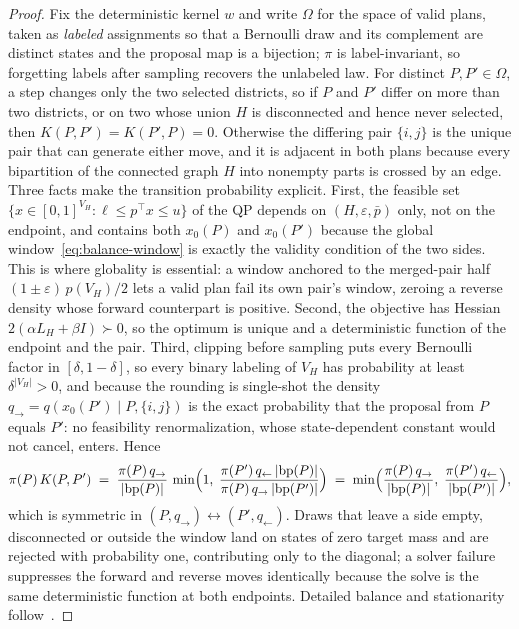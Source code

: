 \documentclass[11pt]{article}
\begin{document}
\begin{proof}
Fix the deterministic kernel $w$ and write $\Omega$ for the space of
valid plans, taken as \emph{labeled} assignments so that a Bernoulli
draw and its complement are distinct states and the proposal map is a
bijection; $\pi$ is label-invariant, so forgetting labels after
sampling recovers the unlabeled law. For distinct $P, P' \in \Omega$,
a step changes only the two selected districts, so if $P$ and $P'$
differ on more than two districts, or on two whose union $H$ is
disconnected and hence never selected, then $K(P,P') = K(P',P) = 0$.
Otherwise the differing pair $\{i,j\}$ is the unique pair that can
generate either move, and it is adjacent in both plans because every
bipartition of the connected graph $H$ into nonempty parts is crossed
by an edge. Three facts make the transition probability explicit.
First, the feasible set $\{x \in [0,1]^{V_H} : \ell \le p^\top x \le u\}$
of the QP depends on $(H, \varepsilon, \bar p)$ only, not on the
endpoint, and contains both $x_0(P)$ and $x_0(P')$ because the global
window~\eqref{eq:balance-window} is exactly the validity condition of
the two sides. This is where globality is essential: a window anchored
to the merged-pair half $(1 \pm \varepsilon)\,p(V_H)/2$ lets a valid
plan fail its own pair's window, zeroing a reverse density whose
forward counterpart is positive. Second, the objective has Hessian
$2(\alpha L_H + \beta I) \succ 0$, so the optimum is unique and a
deterministic function of the endpoint and the pair. Third, clipping
before sampling puts every Bernoulli factor in $[\delta, 1-\delta]$, so
every binary labeling of $V_H$ has probability at least
$\delta^{|V_H|} > 0$, and because the rounding is single-shot the
density $q_{\to} = q(x_0(P') \mid P, \{i,j\})$ is the exact probability
that the proposal from $P$ equals $P'$: no feasibility
renormalization, whose state-dependent constant would not cancel,
enters. Hence
\[
  \pi(P)\, K(P, P') \;=\;
  \frac{\pi(P)\, q_{\to}}{|\mathrm{bp}(P)|}\,
  \min\Bigl(1,\;
  \frac{\pi(P')\, q_{\gets}\, |\mathrm{bp}(P)|}
       {\pi(P)\, q_{\to}\, |\mathrm{bp}(P')|}\Bigr)
  \;=\;
  \min\Bigl(
  \frac{\pi(P)\, q_{\to}}{|\mathrm{bp}(P)|},\;
  \frac{\pi(P')\, q_{\gets}}{|\mathrm{bp}(P')|}
  \Bigr),
\]
which is symmetric in $(P, q_{\to}) \leftrightarrow (P', q_{\gets})$.
Draws that leave a side empty, disconnected or outside the window
land on states of zero target mass and are rejected with probability
one, contributing only to the diagonal; a solver failure suppresses
the forward and reverse moves identically because the solve is the
same deterministic function at both endpoints. Detailed balance and
stationarity follow~\cite{tierney1998note}.
\end{proof}
\end{document}
